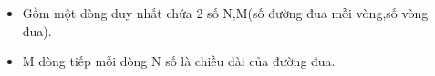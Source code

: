 \begin{itemize}
	\item     Gồm một dòng duy nhất chứa 2 số N,M(số đường đua mỗi vòng,số vòng đua).   
	\item     M dòng tiếp mỗi dòng N số là chiều dài của đường đua.   
\end{itemize}